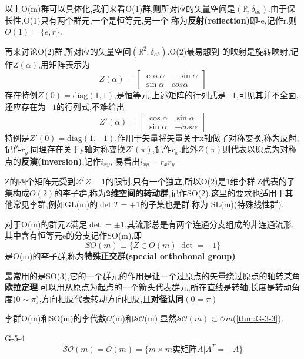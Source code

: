 \documentclass[../main.tex]{subfiles}
\begin{document}
 以上O(m)群可以具体化,我们来看O(1)群,则所对应的矢量空间是$(\mathbb{R},\delta_{ab})$.由于保长性,O(1)只有两个群元,一个是恒等元,另一个
 称为\textbf{反射(reflection)}即-e,记作r.则$O(1)= \{e,r\}$.

 再来讨论O(2)群,所对应的矢量空间$(\mathbb{R}^2,\delta_{ab})$.O(2)最易想到
 的映射是旋转映射,记作$Z(\alpha)$,用矩阵表示为
 \begin{equation*}
     Z(\alpha) = \begin{bmatrix}
         \cos\alpha&-\sin \alpha\\
         \sin\alpha&cos\alpha
     \end{bmatrix}
 \end{equation*}
 存在特例$Z(0) = \text{diag}(1,1)$,是恒等元,上述矩阵的行列式是$+1$,可见其并不全面,还应存在为$-1$的行列式,不难给出
 \begin{equation*}
     Z'(\alpha) = \begin{bmatrix}
         \cos\alpha&\sin \alpha\\
         \sin\alpha&-cos\alpha
     \end{bmatrix}
 \end{equation*}
 特例是$Z'(0) = \text{diag}(1,-1)$,作用于矢量将矢量关于x轴做了对称变换,称为反射,记作$r_y$.同理存在关于y轴对称变换$Z'(\pi)$,记作$r_x$.此外$Z(\pi)$则代表以原点为对称点的\textbf{反演(inversion)},记作$i_{xy}$,
 易看出$i_{xy} = r_xr_y$

 Z的四个矩阵元受到$Z^TZ =1$的限制,只有一个独立,所以O(2)是1维李群.Z代表的子集构成$O(2)$的李子群,称为\textbf{2维空间的转动群},记作SO(2).这里的要求也适用于其他常见李群,例如GL(m)的$\det T = +1$的子集也是群,称为
 SL(m)(特殊线性群).

 对于O(m)的群元Z满足$\det = \pm 1$,其流形总是有两个连通分支组成的非连通流形,其中含有恒等元e的分支记作SO(m),即
 $$SO(m) \equiv \{Z\in O(m)|\det = +1\}$$
 是O(m)的李子群,称为\textbf{特殊正交群(special orthohonal group)}

 最常用的是SO(3),它的一个群元的作用是让一个过原点的矢量绕过原点的轴转某角\textbf{欧拉定理}.可以用从原点为起点的一个箭头代表群元,所在直线是转轴,长度是转动角度($0\sim \pi$),方向相反代表转动方向相反,且\textbf{对径认同}$(0 = \pi)$

 李群O(m)和SO(m)的李代数$\mathscr{O}$(m)和$\mathscr{SO}$(m),显然$\mathscr{SO}(m)\subset \mathscr{O}{m}$(\ref{thm:G-3-3}).
  \begin{theorem}{}{G-5-4}
     $$\mathscr{SO}(m) = \mathscr{O}(m) = \{m\times m \text{实矩阵}A|A^T = -A\}$$
  \end{theorem}
\end{document}
